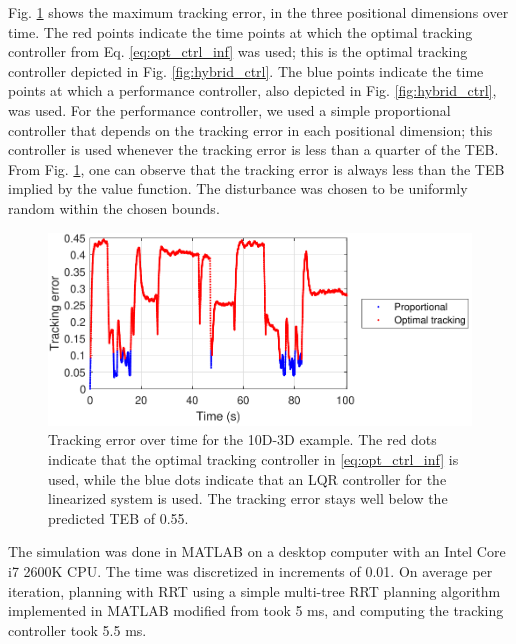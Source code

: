 Fig. \ref{fig:tracking_error_RRT} shows the maximum tracking error, in the three positional dimensions over time.
The red points indicate the time points at which the optimal tracking controller from Eq. \eqref{eq:opt_ctrl_inf} was used; this is the optimal tracking controller depicted in Fig. \ref{fig:hybrid_ctrl}. 
The blue points indicate the time points at which a performance controller, also depicted in Fig. \ref{fig:hybrid_ctrl}, was used.
For the performance controller, we used a simple proportional controller that depends on the tracking error in each positional dimension; this controller is used whenever the tracking error is less than a quarter of the TEB.
From Fig. \ref{fig:tracking_error_RRT}, one can observe that the tracking error is always less than the TEB implied by the value function.
The disturbance was chosen to be uniformly random within the chosen bounds.


\begin{figure}
  \includegraphics[width=\columnwidth]{fig/Q10D_Q3D/tracking_error}
  \caption{Tracking error over time for the 10D-3D example. The red dots indicate that the optimal tracking controller in \eqref{eq:opt_ctrl_inf} is used, while the blue dots indicate that an LQR controller for the linearized system is used. The tracking error stays well below the predicted TEB of 0.55.}
  \label{fig:tracking_error_RRT}  
\end{figure}

The simulation was done in MATLAB on a desktop computer with an Intel Core i7 2600K CPU.
The time was discretized in increments of 0.01.
On average per iteration, planning with RRT using a simple multi-tree RRT planning algorithm implemented in MATLAB modified from \cite{Gavin2013} took 5 ms, and computing the tracking controller took 5.5 ms. 

